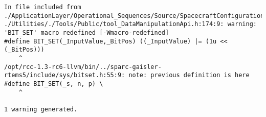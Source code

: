 
\noindent\begin{minipage}{\textwidth}
\begin{lstlisting}[language={}, caption=ESAIL compilation warning with RTEMS 5 and clang., label=rtems5_error]
In file included from ./ApplicationLayer/Operational_Sequences/Source/SpacecraftConfigurationVector.c:36: ./Utilities/./Tools/Public/tool_DataManipulationApi.h:174:9: warning: 'BIT_SET' macro redefined [-Wmacro-redefined]
#define BIT_SET(_InputValue,_BitPos) ((_InputValue) |= (1u << (_BitPos)))
	^
/opt/rcc-1.3-rc6-llvm/bin/../sparc-gaisler-rtems5/include/sys/bitset.h:55:9: note: previous definition is here
#define BIT_SET(_s, n, p) \
	^

1 warning generated.
\end{lstlisting}
\end{minipage}